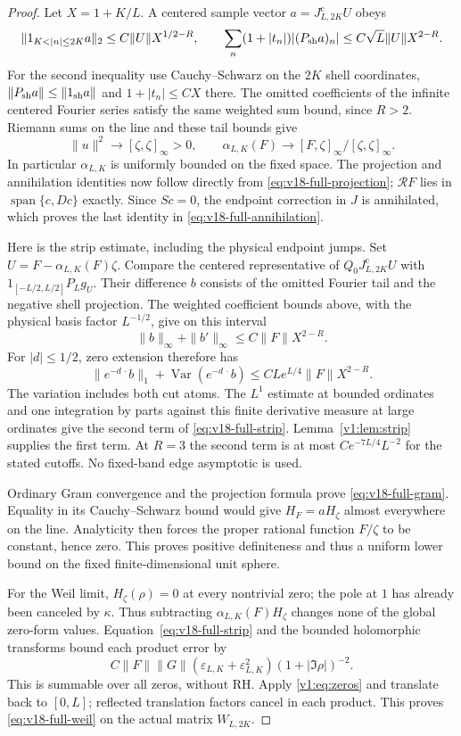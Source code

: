 \documentclass[11pt]{article}
\theoremstyle{remark}
\newcommand{\Jc}{J^{\mathrm c}}
\begin{document}
\begin{proof}
Let $X=1+K/L$. A centered sample vector $a=\Jc_{L,2K}U$ obeys
\[
 \|1_{K<|n|\le2K}a\|_2\le C\|U\|X^{1/2-R},\qquad
 \sum_n(1+|t_n|)|(P_{\rm sh}a)_n|
       \le C\sqrt L\|U\|X^{2-R}.
\]
For the second inequality use Cauchy--Schwarz on the $2K$ shell
coordinates, $\|P_{\rm sh}a\|\le\|1_{\rm sh}a\|$ and
$1+|t_n|\le CX$ there. The omitted coefficients of the infinite
centered Fourier series satisfy the same weighted sum bound, since
$R>2$. Riemann sums on the line and these tail bounds give
\[
 \|u\|^2\longrightarrow[\zeta,\zeta]_\infty>0,\qquad
 \alpha_{L,K}(F)\longrightarrow
       [F,\zeta]_\infty/[\zeta,\zeta]_\infty.
\]
In particular $\alpha_{L,K}$ is uniformly bounded on the fixed space.
The projection and annihilation identities now follow directly from
\eqref{eq:v18-full-projection}; $\mathcal R F$ lies in
$\operatorname{span}\{c,Dc\}$ exactly. Since $Sc=0$, the endpoint
correction in $J$ is annihilated, which proves the last identity in
\eqref{eq:v18-full-annihilation}.

Here is the strip estimate, including the physical endpoint jumps.
Set $U=F-\alpha_{L,K}(F)\zeta$. Compare the centered representative
of $Q_0\Jc_{L,2K}U$ with $1_{[-L/2,L/2]}P_Lg_U$.
Their difference $b$ consists of the omitted Fourier tail and the
negative shell projection. The weighted coefficient bounds above,
with the physical basis factor $L^{-1/2}$, give on this interval
\[
 \|b\|_\infty+\|b'\|_\infty
       \le C\|F\|X^{2-R}.
\]
For $|d|\le1/2$, zero extension therefore has
\[
 \|e^{-d\,\cdot}b\|_1+
 \operatorname{Var}(e^{-d\,\cdot}b)
       \le CL e^{L/4}\|F\|X^{2-R}.
\]
The variation includes both cut atoms. The $L^1$ estimate at bounded
ordinates and one integration by parts against this finite derivative
measure at large ordinates give the second term of
\eqref{eq:v18-full-strip}. Lemma~\ref{v1:lem:strip} supplies the
first term. At $R=3$ the second term is at most
$C e^{-7L/4}L^{-2}$ for the stated cutoffs. No fixed-band edge
asymptotic is used.

Ordinary Gram convergence and the projection formula prove
\eqref{eq:v18-full-gram}. Equality in its Cauchy--Schwarz bound
would give $H_F=aH_\zeta$ almost everywhere on the line.
Analyticity then forces the proper rational function $F/\zeta$
to be constant, hence zero. This proves positive definiteness and
thus a uniform lower bound on the fixed finite-dimensional unit sphere.

For the Weil limit, $H_\zeta(\rho)=0$ at every nontrivial zero;
the pole at $1$ has already been canceled by $\kappa$.
Thus subtracting $\alpha_{L,K}(F)H_\zeta$ changes none of the
global zero-form values. Equation~\eqref{eq:v18-full-strip} and
the bounded holomorphic transforms bound each product error by
\[
 C\|F\|\|G\|
 (\varepsilon_{L,K}+\varepsilon_{L,K}^2)
                       (1+|\Im\rho|)^{-2}.
\]
This is summable over all zeros, without RH. Apply
\eqref{v1:eq:zeros} and translate back to $[0,L]$; reflected
translation factors cancel in each product. This proves
\eqref{eq:v18-full-weil} on the actual matrix $W_{L,2K}$.
\end{proof}
\end{document}
